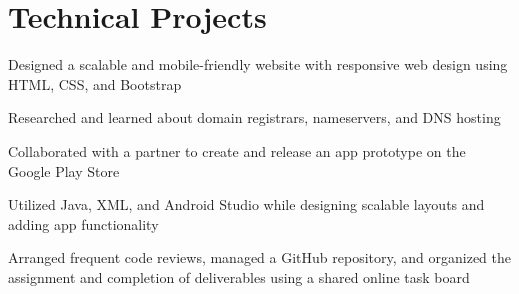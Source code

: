 \begin{minipage}[t]{0.66\textwidth}

\section{Technical Projects}

\descript{ } %
\begin{tightitemize}
\item Designed a scalable and mobile-friendly website with responsive web design using HTML, CSS, and Bootstrap
\item Researched and learned about domain registrars, nameservers, and DNS hosting
\end{tightitemize}

\sectionspace %


\descript{ } %
\begin{tightitemize}
\item Collaborated with a partner to create and release an app prototype on the Google Play Store
\item Utilized Java, XML, and Android Studio while designing scalable layouts and adding app functionality
\item Arranged frequent code reviews, managed a GitHub repository, and organized the assignment and completion of deliverables using a shared online task board
\end{tightitemize}
\sectionspace %



\end{minipage}
